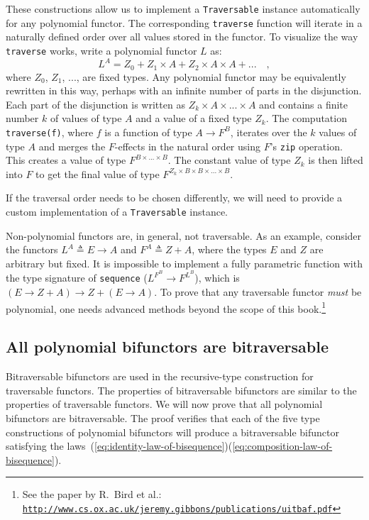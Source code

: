 These constructions allow us to implement a \lstinline!Traversable!
instance automatically for any polynomial functor. The corresponding
\lstinline!traverse! function will iterate in a naturally defined
order over all values stored in the functor. To visualize the way
\lstinline!traverse! works, write a polynomial functor $L$ as:
\[
L^{A}=Z_{0}+Z_{1}\times A+Z_{2}\times A\times A+...\quad,
\]
where $Z_{0}$, $Z_{1}$, ..., are fixed types. Any polynomial functor
may be equivalently rewritten in this way, perhaps with an infinite
number of parts in the disjunction. Each part of the disjunction is
written as $Z_{k}\times A\times...\times A$ and contains a finite
number $k$ of values of type $A$ and a value of a fixed type $Z_{k}$.
The computation \lstinline!traverse(f)!, where $f$ is a function
of type $A\rightarrow F^{B}$, iterates over the $k$ values of type
$A$ and merges the $F$-effects in the natural order using $F$\textsf{'}s
\lstinline!zip! operation. This creates a value of type $F^{B\times...\times B}$.
The constant value of type $Z_{k}$ is then lifted into $F$ to get
the final value of type $F^{Z_{k}\times B\times B\times...\times B}$.

If the traversal order needs to be chosen differently, we will need
to provide a custom implementation of a \lstinline!Traversable! instance.

Non-polynomial functors are, in general, not traversable. As an example,
consider the functors $L^{A}\triangleq E\rightarrow A$ and $F^{A}\triangleq Z+A$,
where the types $E$ and $Z$ are arbitrary but fixed. It is impossible
to implement a fully parametric function with the type signature of
\lstinline!sequence! ($L^{F^{B}}\rightarrow F^{L^{B}}$), which is
$(E\rightarrow Z+A)\rightarrow Z+(E\rightarrow A)$. To prove that
any traversable functor \emph{must} be polynomial, one needs advanced
methods beyond the scope of this book.\footnote{See the paper by R.~Bird et al.: \texttt{\href{http://www.cs.ox.ac.uk/jeremy.gibbons/publications/uitbaf.pdf}{http://www.cs.ox.ac.uk/jeremy.gibbons/publications/uitbaf.pdf}}}

\subsection{All polynomial bifunctors are bitraversable\label{subsec:All-polynomial-bifunctors-are-bitraversable}}

Bitraversable bifunctors are used in the recursive-type construction
for traversable functors. The properties of bitraversable bifunctors
are similar to the properties of traversable functors. We will now
prove that all polynomial bifunctors are bitraversable. The proof
verifies that each of the five type constructions of polynomial bifunctors
will produce a bitraversable bifunctor satisfying the laws~(\ref{eq:identity-law-of-bisequence})\textendash (\ref{eq:composition-law-of-bisequence}).


